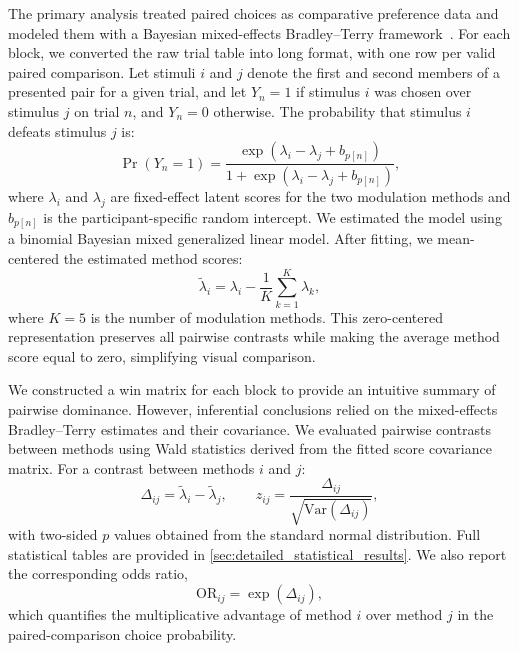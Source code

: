 \documentclass[pdflatex, sn-nature]{sn-jnl}
\theoremstyle{thmstyleone}%
\theoremstyle{thmstyletwo}%
\theoremstyle{thmstylethree}%
\begin{document}
The primary analysis treated paired choices as comparative preference data and modeled them with a Bayesian mixed-effects Bradley--Terry framework~\citep{bradleyRankAnalysisIncomplete1952}. For each block, we converted the raw trial table into long format, with one row per valid paired comparison. Let stimuli $i$ and $j$ denote the first and second members of a presented pair for a given trial, and let $Y_{n}=1$ if stimulus $i$ was chosen over stimulus $j$ on trial $n$, and $Y_{n}=0$ otherwise. The probability that stimulus $i$ defeats stimulus $j$ is:
\begin{equation}
    \Pr(Y_n=1)=\frac{\exp\left(\lambda_i-\lambda_j+b_{p[n]}\right)}{1+\exp\left(\lambda_i-\lambda_j+b_{p[n]}\right)} ,
\end{equation}
where $\lambda_i$ and $\lambda_j$ are fixed-effect latent scores for the two modulation methods and $b_{p[n]}$ is the participant-specific random intercept. We estimated the model using a binomial Bayesian mixed generalized linear model. After fitting, we mean-centered the estimated method scores:
\begin{equation}
    \tilde{\lambda}_i = \lambda_i - \frac{1}{K}\sum_{k=1}^{K}\lambda_k,
\end{equation}
where $K=5$ is the number of modulation methods. This zero-centered representation preserves all pairwise contrasts while making the average method score equal to zero, simplifying visual comparison.

We constructed a win matrix for each block to provide an intuitive summary of pairwise dominance. However, inferential conclusions relied on the mixed-effects Bradley--Terry estimates and their covariance. We evaluated pairwise contrasts between methods using Wald statistics derived from the fitted score covariance matrix. For a contrast between methods $i$ and $j$:
\begin{equation}
    \Delta_{ij}=\tilde{\lambda}_i-\tilde{\lambda}_j,
    \qquad
    z_{ij}=\frac{\Delta_{ij}}{\sqrt{\mathrm{Var}(\Delta_{ij})}},
\end{equation}
with two-sided $p$ values obtained from the standard normal distribution. Full statistical tables are provided in \cref{sec:detailed_statistical_results}. We also report the corresponding odds ratio,
\begin{equation}
    \mathrm{OR}_{ij}=\exp(\Delta_{ij}),
\end{equation}
which quantifies the multiplicative advantage of method $i$ over method $j$ in the paired-comparison choice probability.
\end{document}
